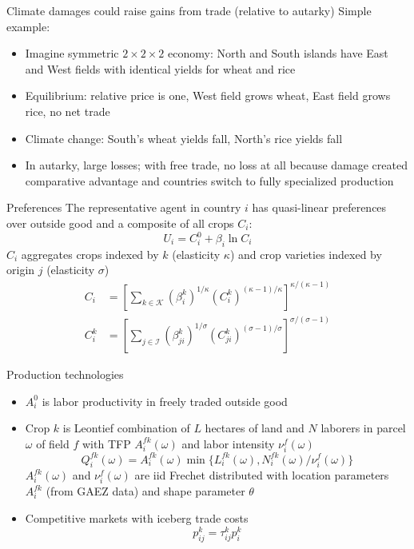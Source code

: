 \documentclass[11pt,notes=hide,aspectratio=169]{beamer}
\begin{document}
\begin{frame}{Climate damages could raise gains from trade (relative to autarky)}
Simple example:
\begin{itemize}
\item Imagine symmetric $2\times2\times2$ economy: North and South islands have East and West fields with identical yields for wheat and rice
\item Equilibrium: relative price is one, West field grows wheat, East field grows rice, no net trade
\item Climate change: South's wheat yields fall, North's rice yields fall
\item In autarky, large losses; with free trade, no loss at all because damage created comparative advantage and countries switch to fully specialized production
\end{itemize}
\end{frame}
\begin{frame}{Preferences}
The representative agent in country $i$ has quasi-linear preferences over outside good and a composite of all crops $C_i$:
\begin{equation*}
U_i = C_i^0 + \beta_i \ln C_i
\end{equation*}
$C_i$ aggregates crops indexed by $k$ (elasticity $\kappa$) and crop varieties indexed by origin $j$ (elasticity $\sigma$)
\begin{align*}
C_i &= \left[ \sum_{k \in \mathcal{K}} (\beta_i^k)^{1/\kappa} (C_i^k)^{(\kappa-1)/\kappa} \right]^{\kappa/(\kappa-1)}
\\
C_i^k &= \left[ \sum_{j \in \mathcal{I}} (\beta_{ji}^k)^{1/\sigma} (C_{ji}^k)^{(\sigma-1)/\sigma} \right]^{\sigma/(\sigma-1)}
\end{align*}
\end{frame}
\begin{frame}{Production technologies}
\begin{itemize}
\item $A_i^0$ is labor productivity in freely traded outside good
\item Crop $k$ is Leontief combination of $L$ hectares of land and $N$ laborers in parcel $\omega$ of field $f$
with TFP $A_i^{fk}(\omega)$ and labor intensity $\nu_i^f(\omega)$
\begin{equation*}
Q_i^{fk}(\omega) = A_i^{fk}(\omega) \min\{L_i^{fk}(\omega), N_i^{fk}(\omega)/\nu_i^f(\omega)\}
\end{equation*}
$A_i^{fk}(\omega)$ and $\nu_i^f(\omega)$ are iid Frechet distributed with location parameters $A_i^{fk}$ (from GAEZ data) and shape parameter $\theta$
\item Competitive markets with iceberg trade costs
\begin{equation*}
p_{ij}^k = \tau_{ij}^k p_i^k
\end{equation*}
\end{itemize}
\end{frame}
\end{document}
